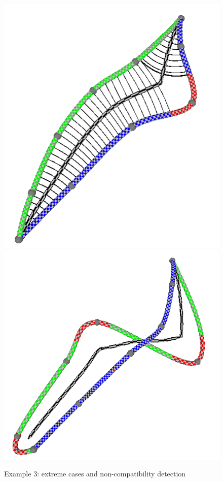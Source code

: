 \documentclass[journal, letterpaper]{IEEEtran}
\begin{document}
\begin{figure}
	\centering
		\includegraphics[scale=0.5]{images/Result4.png}
		\includegraphics[scale=0.5]{images/Result5.png}
	\caption{Example 3: extreme cases and non-compatibility detection}
	\label{fig:Result4}
\end{figure}
\end{document}
